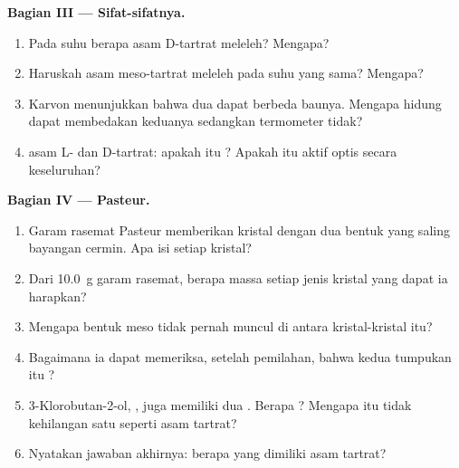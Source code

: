 \begin{problem}
\medskip
\noindent\textbf{Bagian III --- Sifat-sifatnya.}
\begin{enumerate}[resume]
  \item Pada suhu berapa asam D-tartrat meleleh? Mengapa?
  \item Haruskah asam meso-tartrat meleleh pada suhu yang sama? Mengapa?
  \item Karvon menunjukkan bahwa dua  dapat berbeda baunya.
        Mengapa hidung dapat membedakan keduanya sedangkan termometer
        tidak?
  \item {} asam L- dan D-tartrat: apakah  itu ? Apakah  itu aktif optis secara keseluruhan?
\end{enumerate}

\medskip
\noindent\textbf{Bagian IV --- Pasteur.}
\begin{enumerate}[resume]
  \item Garam rasemat Pasteur memberikan kristal dengan dua bentuk yang
        saling bayangan cermin. Apa isi setiap kristal?
  \item Dari \qty{10.0}{g} garam rasemat, berapa massa setiap jenis
        kristal yang dapat ia harapkan?
  \item Mengapa bentuk meso tidak pernah muncul di antara kristal-kristal
        itu?
  \item Bagaimana ia dapat memeriksa, setelah pemilahan, bahwa kedua
        tumpukan itu ?
  \item 3-Klorobutan-2-ol, , juga memiliki dua
        . Berapa ? Mengapa  itu
        tidak kehilangan satu  seperti asam tartrat?
  \item Nyatakan jawaban akhirnya: berapa  yang dimiliki
        asam tartrat?
\end{enumerate}
\end{problem}
